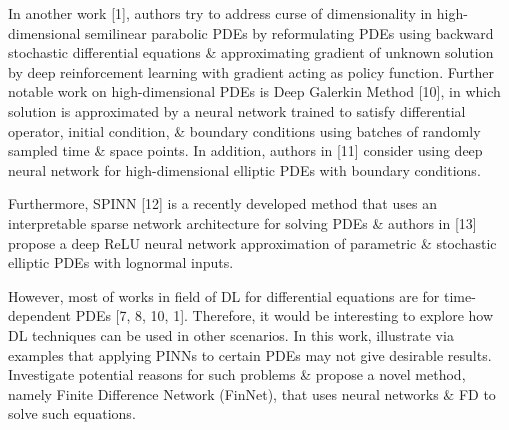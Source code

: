 \documentclass{article}
\begin{document}
\begin{itemize}
	In another work [1], authors try to address curse of dimensionality in high-dimensional semilinear parabolic PDEs by reformulating PDEs using backward stochastic differential equations \& approximating gradient of unknown solution by deep reinforcement learning with gradient acting as policy function. Further notable work on high-dimensional PDEs is Deep Galerkin Method [10], in which solution is approximated by a neural network trained to satisfy differential operator, initial condition, \& boundary conditions using batches of randomly sampled time \& space points. In addition, authors in [11] consider using deep neural network for high-dimensional elliptic PDEs with boundary conditions.
	
	Furthermore, SPINN [12] is a recently developed method that uses an interpretable sparse network architecture for solving PDEs \& authors in [13] propose a deep ReLU neural network approximation of parametric \& stochastic elliptic PDEs with lognormal inputs.
	
	However, most of works in field of DL for differential equations are for time-dependent PDEs [7, 8, 10, 1]. Therefore, it would be interesting to explore how DL techniques can be used in other scenarios. In this work, illustrate via examples that applying PINNs to certain PDEs may not give desirable results. Investigate potential reasons for such problems \& propose a novel method, namely Finite Difference Network (FinNet), that uses neural networks \& FD to solve such equations.
	

\end{itemize}
\end{document}
